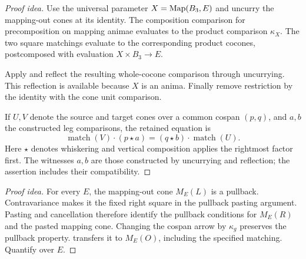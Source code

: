 \documentclass[11pt]{article}
\begin{document}
\begin{proof}[Proof idea]
Use the universal parameter $X=\operatorname{Map}(B_3,E)$ and uncurry the mapping-out
cones at its identity. The composition comparison for precomposition on
mapping animae evaluates to the product comparison $\kappa_X$.
The two square matchings evaluate to the corresponding product cocones,
postcomposed with evaluation $X\times B_3\to E$.

Apply  and reflect the resulting
whole-cocone comparison through uncurrying. This reflection is available
because $X$ is an anima. Finally remove restriction by the identity with
the cone unit comparison.

If $U,V$ denote the source and target cones over a common cospan $(p,q)$,
and $a,b$ the constructed leg comparisons, the retained equation is
\[
 \operatorname{match}(V)\cdot(p\star a)
   =(q\star b)\cdot\operatorname{match}(U).
\]
Here $\star$ denotes whiskering and vertical composition applies the
rightmost factor first. The witnesses $a,b$ are those constructed by
uncurrying and reflection; the assertion includes their compatibility.
\end{proof}

\begin{proof}[Proof idea]
For every $E$, the mapping-out cone $M_E(L)$ is a pullback. Contravariance
makes it the fixed right square in the pullback pasting argument.
Pasting and cancellation therefore identify the pullback conditions for
$M_E(R)$ and the pasted mapping cone. Changing the cospan arrow by
$\kappa_g$ preserves the pullback property.
 transfers it to $M_E(O)$,
including the specified matching. Quantify over $E$.
\end{proof}
\end{document}

